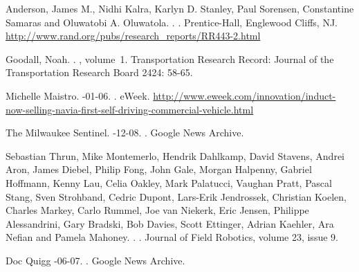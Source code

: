 \documentclass[11pt]{article}
\begin{document}
\begin{thebibliography}{}

Anderson, James M., Nidhi Kalra, Karlyn D. Stanley, Paul Sorensen, Constantine Samaras and Oluwatobi A. Oluwatola.
.
.
\newblock Prentice-{Hall}, Englewood Cliffs, NJ.
\newblock \href{http://www.rand.org/pubs/research\_reports/RR443-2.html}{http://www.rand.org/pubs/research\_reports/RR443-2.html}

Goodall, Noah.
.
, volume~1. 
\newblock Transportation Research Record: Journal of the Transportation Research Board 2424: 58-65.

Michelle Maistro.
-01-06.
.
\newblock eWeek.
\newblock \href{http://www.eweek.com/innovation/induct-now-selling-navia-first-self-driving-commercial-vehicle.html}{http://www.eweek.com/innovation/induct-now-selling-navia-first-self-driving-commercial-vehicle.html}

The Milwaukee Sentinel.
-12-08.
.
\newblock Google News Archive.

Sebastian Thrun, Mike Montemerlo, Hendrik Dahlkamp, David Stavens, Andrei Aron, James Diebel, Philip Fong, John Gale, Morgan Halpenny, Gabriel Hoffmann, Kenny Lau, Celia Oakley, Mark Palatucci, Vaughan Pratt, Pascal Stang, Sven Strohband, Cedric Dupont, Lars-Erik Jendrossek, Christian Koelen, Charles Markey, Carlo Rummel, Joe van Niekerk, Eric Jensen, Philippe Alessandrini, Gary Bradski, Bob Davies, Scott Ettinger, Adrian Kaehler, Ara Nefian and Pamela Mahoney.
.
.
\newblock Journal of Field Robotics, volume 23, issue 9.

Doc Quigg
-06-07.
.
\newblock Google News Archive.


\end{thebibliography}
\end{document}

